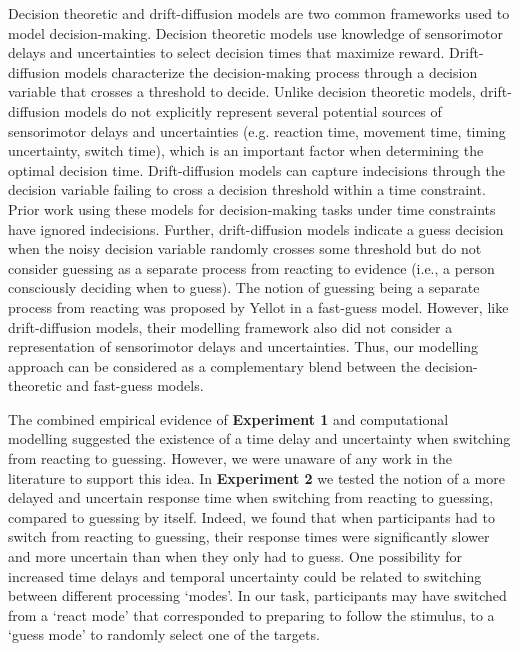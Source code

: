 \documentclass[12pt]{article}
\newcommand\boldblue[1]{\textcolor{mydarkblue}{\textbf{#1}}}
\begin{document}
Decision theoretic and drift-diffusion models are two common frameworks used to model decision-making. Decision theoretic models use knowledge of sensorimotor delays and uncertainties to select decision times that maximize reward\autocite*{mileticCautionDecisionmakingTime2019,balciRiskAssessmentMan2009, onagawaRiskAversionAdjustment2019,battagliaHumansTradeViewing2007}. Drift-diffusion models characterize the decision-making process through a decision variable that crosses a threshold to decide\autocite*{ratcliffModeling2alternativeForcedchoice2018,ratcliffDiffusionDecisionModel2008}. Unlike decision theoretic models, drift-diffusion models do not explicitly represent several potential sources of sensorimotor delays and uncertainties (e.g. reaction time, movement time, timing uncertainty, switch time), which is an important factor when determining the optimal decision time. Drift-diffusion models can capture indecisions through the decision variable failing to cross a decision threshold within a time constraint. Prior work using these models for decision-making tasks under time constraints have ignored indecisions\autocite*{karsilarSpeedAccuracyTradeoff2014,farashahiDynamicCombinationSensory2018}. Further, drift-diffusion models indicate a guess decision when the noisy decision variable randomly crosses some threshold but do not consider guessing as a separate process from reacting to evidence (i.e., a person consciously deciding when to guess). The notion of guessing being a separate process from reacting was proposed by Yellot in a fast-guess model\autocite*{yellottCorrectionFastGuessing1971}. However, like drift-diffusion models, their modelling framework also did not consider a representation of sensorimotor delays and uncertainties. Thus, our modelling approach can be considered as a complementary blend between the decision-theoretic and fast-guess models. 

The combined empirical evidence of \boldblue{Experiment 1} and computational modelling suggested the existence of a time delay and uncertainty when switching from reacting to guessing. However, we were unaware of any work in the literature to support this idea. In \boldblue{Experiment 2} we tested the notion of a more delayed and uncertain response time when switching from reacting to guessing, compared to guessing by itself. Indeed, we found that when participants had to switch from reacting to guessing, their response times were significantly slower and more uncertain than when they only had to guess. One possibility for increased time delays and temporal uncertainty could be related to switching between different processing ‘modes’. In our task, participants may have switched from a `react mode’ that corresponded to preparing to follow the stimulus, to a `guess mode’ to randomly select one of the targets.
\end{document}
